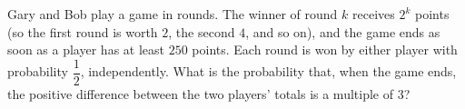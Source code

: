 Gary and Bob play a game in rounds. The winner of round $k$ receives $2^k$ points (so the first round is worth $2$, the second $4$, and so on), and the game ends as soon as a player has at least $250$ points. Each round is won by either player with probability $\dfrac{1}{2}$, independently. What is the probability that, when the game ends, the positive difference between the two players' totals is a multiple of $3$?
